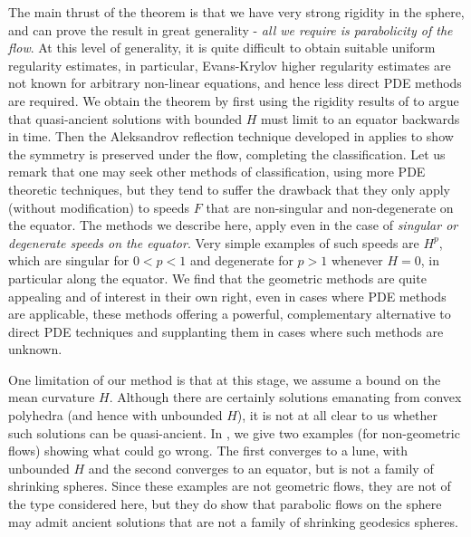 \documentclass{amsart}
\begin{document}
The main thrust of the theorem is that we have very strong rigidity in the sphere, and can prove the result in great generality - \emph{all we require is parabolicity of the flow}. At this level of generality, it is quite difficult to obtain suitable uniform regularity estimates, in particular, Evans-Krylov higher regularity estimates are not known for arbitrary non-linear equations, and hence less direct PDE methods are required. We obtain the theorem by first using the rigidity results of \cite{MakowskiScheuer:/2013} to argue that quasi-ancient solutions with bounded \(H\) must limit to an equator backwards in time. Then the Aleksandrov reflection technique developed in \cite{2015arXiv150802821B,bryanlouie} applies to show the symmetry is preserved under the flow, completing the classification. Let us remark that one may seek other methods of classification, using more PDE theoretic techniques, but they tend to suffer the drawback that they only apply (without modification) to speeds \(F\) that are non-singular and non-degenerate on the equator. The methods we describe here, apply even in the case of \emph{singular or degenerate speeds on the equator}. Very simple examples of such speeds are \(H^p\), which are singular for \(0 < p < 1\) and degenerate for \(p > 1\) whenever \(H = 0\), in particular along the equator. We find that the geometric methods are quite appealing and of interest in their own right, even in cases where PDE methods are applicable, these methods offering a powerful, complementary alternative to direct PDE techniques and supplanting them in cases where such methods are unknown.

One limitation of our method is that at this stage, we assume a bound on the mean curvature \(H\). Although there are certainly solutions emanating from convex polyhedra (and hence with unbounded \(H\)), it is not at all clear to us whether such solutions can be quasi-ancient. In , we give two examples (for non-geometric flows) showing what could go wrong. The first converges to a lune, with unbounded \(H\) and the second converges to an equator, but is not a family of shrinking spheres. Since these examples are not geometric flows, they are not of the type considered here, but they do show that parabolic flows on the sphere may admit ancient solutions that are not a family of shrinking geodesics spheres.
\end{document}
